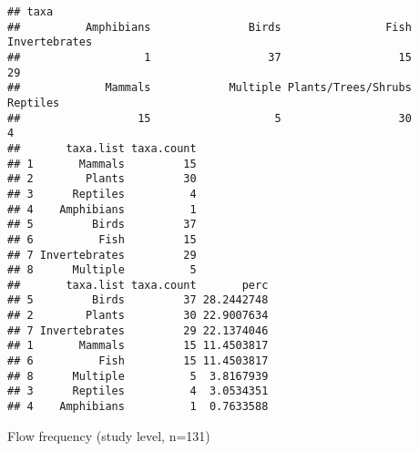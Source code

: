 \documentclass[
]{article}
\begin{document}
\begin{verbatim}
## taxa
##          Amphibians               Birds                Fish       Invertebrates 
##                   1                  37                  15                  29 
##             Mammals            Multiple Plants/Trees/Shrubs            Reptiles 
##                  15                   5                  30                   4 
##       taxa.list taxa.count
## 1       Mammals         15
## 2        Plants         30
## 3      Reptiles          4
## 4    Amphibians          1
## 5         Birds         37
## 6          Fish         15
## 7 Invertebrates         29
## 8      Multiple          5
##       taxa.list taxa.count       perc
## 5         Birds         37 28.2442748
## 2        Plants         30 22.9007634
## 7 Invertebrates         29 22.1374046
## 1       Mammals         15 11.4503817
## 6          Fish         15 11.4503817
## 8      Multiple          5  3.8167939
## 3      Reptiles          4  3.0534351
## 4    Amphibians          1  0.7633588
\end{verbatim}

Flow frequency (study level, n=131)
\end{document}
